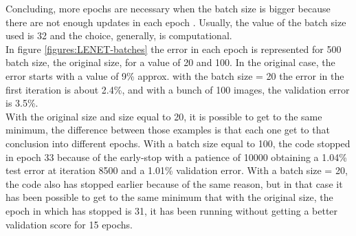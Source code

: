 Concluding, more epochs are necessary when the batch size is bigger because there are not enough updates in each epoch \cite{Yoshua}. Usually, the value of the batch size used is 32 \cite{Yoshua} and the choice, generally, is computational.\\

In figure \ref{figures:LENET-batches} the error in each epoch is represented  for 500 batch size, the original size, for a value of 20 and 100. In the original case, the error starts with a value of 9\% approx. with the batch size = 20 the error in the first iteration is about 2.4\%, and with a bunch of 100 images, the validation error is 3.5\%.\\

With the original size and size equal to 20, it is possible to get to the same minimum, the difference between those examples is that each one get to that conclusion into different epochs. With a batch size equal to 100, the code stopped in epoch 33 because of the early-stop with a patience of 10000 obtaining a 1.04\% test error at iteration 8500 and a 1.01\% validation error. With a batch size = 20, the code also has stopped earlier because of the same reason, but in that case it has been possible to get to the same minimum that with the original size, the epoch in which has stopped is 31, it has been running without getting a better validation score for 15 epochs.\\




